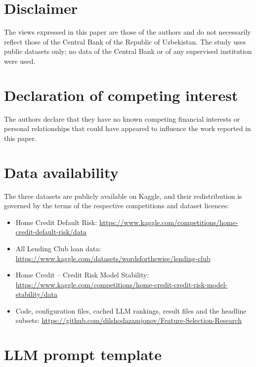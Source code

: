 \documentclass[final,5p,twocolumn]{elsarticle}
\begin{document}
\section*{Disclaimer}
The views expressed in this paper are those of the authors and do not necessarily reflect those of the Central Bank of the Republic of Uzbekistan. The study uses public datasets only; no data of the Central Bank or of any supervised institution were used.

\section*{Declaration of competing interest}
The authors declare that they have no known competing financial interests or personal relationships that could have appeared to influence the work reported in this paper.

\section*{Data availability}
The three datasets are publicly available on Kaggle, and their redistribution is governed by the terms of the respective competitions and dataset licences:
\begin{itemize}
    \item Home Credit Default Risk: \url{https://www.kaggle.com/competitions/home-credit-default-risk/data}
    \item All Lending Club loan data: \url{https://www.kaggle.com/datasets/wordsforthewise/lending-club}
    \item Home Credit -- Credit Risk Model Stability: \url{https://www.kaggle.com/competitions/home-credit-credit-risk-model-stability/data}
    \item Code, configuration files, cached LLM rankings, result files and the headline subsets: \url{https://github.com/dilshodazamjonov/Feature-Selection-Research}
\end{itemize}

\appendix
\section{LLM prompt template}
\label{app:prompts}
\end{document}
